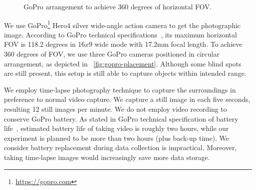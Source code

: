 	\begin{figure}[ht]
	\centering
	\hfill
	\caption[GoPro arrangement]{GoPro arrangement to achieve 360 degrees of horizontal \ac{FOV}.}
	\label{fig:gopro-placement}
	\end{figure}

	We use GoPro\footnote{\url{https://gopro.com}} Hero4 silver wide-angle action camera to get the photographic image. According to GoPro technical specifications~\cite{goprofieldofview}, its maximum horizontal \ac{FOV} is 118.2 degrees in 16$x$9 wide mode with 17.2mm focal length. To achieve 360 degrees of \ac{FOV}, we use three GoPro cameras positioned in circular arrangement, as depicted in ~\autoref{fig:gopro-placement}. Although some blind spots are still present, this setup is still able to capture objects within intended range.

	We employ time-lapse photography technique to capture the surroundings in preference to normal video capture. We capture a still image in each five seconds, resulting 12 still images per minute. We do not employ video recording to conserve GoPro battery. As stated in GoPro technical specification of battery life~\cite{goprobattery}, estimated battery life of taking video is roughly two hours, while our experiment is planned to be more than two hours (plus back-up time). We consider battery replacement during data collection is impractical. Moreover, taking time-lapse images would increasingly save more data storage.
	
